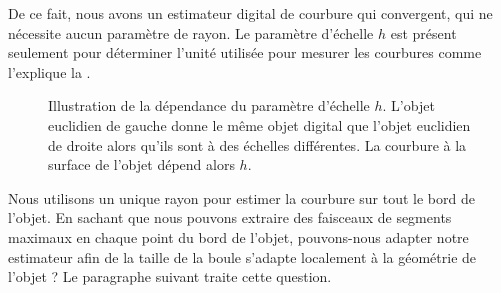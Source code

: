 %
De ce fait, nous avons un estimateur digital de courbure qui convergent, qui ne
nécessite aucun paramètre de rayon. Le paramètre d'échelle $h$ est présent
seulement pour déterminer l'unité utilisée pour mesurer les courbures comme
l'explique la .
%
\begin{figure}[ht]
  \begin{center}
    
  \end{center}
  \caption[Illustration de la dépendance du paramètre d'échelle $h$.]
  {Illustration de la dépendance du paramètre d'échelle $h$. L'objet euclidien
  de gauche donne le même objet digital que l'objet euclidien de droite alors
  qu'ils sont à des échelles différentes. La courbure à la surface de l'objet
  dépend alors $h$.\label{fig:2d-parameter-free-explained}}
\end{figure}
%
Nous utilisons un unique rayon pour estimer la courbure sur tout le bord de
l'objet. En sachant que nous pouvons extraire des faisceaux de segments maximaux
en chaque point du bord de l'objet, pouvons-nous adapter notre estimateur afin
de la taille de la boule s'adapte localement à la géométrie de l'objet ? Le
paragraphe suivant traite cette question.
%

